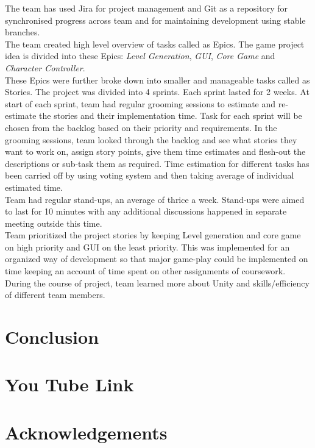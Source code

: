 \documentclass[11pt]{article}
\begin{document}
The team has used Jira for project management and Git as a repository for synchronised progress across team and for  maintaining development using stable branches.\\

The team created high level overview of tasks called as Epics. The game project idea is divided into these Epics: \textit{Level Generation}, \textit{GUI}, \textit{Core Game} and \textit{Character Controller}.\\

These Epics were further broke down into smaller and manageable tasks called as Stories. The project was divided into 4 sprints. Each sprint lasted for 2 weeks. At start of each sprint, team had regular grooming sessions to estimate and re-estimate the stories and their implementation time. Task for each sprint will be chosen from the backlog based on their priority and requirements. In the grooming sessions, team looked through the backlog and see what stories they want to work on, assign story points, give them time estimates and flesh-out the descriptions or sub-task them as required. Time estimation for different tasks has been carried off by using voting system and then taking average of individual estimated time.\\

Team had regular stand-ups, an average of thrice a week. Stand-ups were aimed to last for 10 minutes with any additional discussions happened in separate meeting outside this time.\\

Team prioritized the project stories by keeping Level generation and core game on high priority and GUI on the least priority. This was implemented for an organized way of development so that major game-play could be implemented on time keeping an account of time spent on other assignments of coursework. During the course of project, team learned more about Unity and skills/efficiency of different team members.

\section{Conclusion}

\section{You Tube Link}

\section{Acknowledgements}
\end{document}
